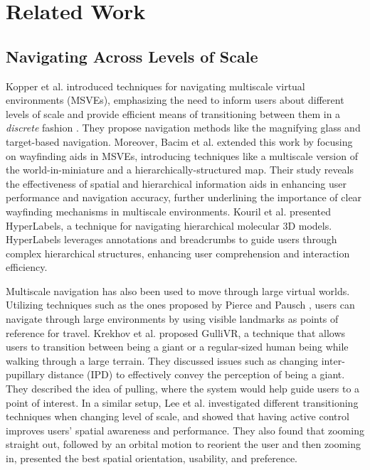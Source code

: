 \section{Related Work}
\subsection{Navigating Across Levels of Scale}
Kopper et al. \cite{kopper_design_2006} introduced techniques for navigating multiscale virtual environments (MSVEs), emphasizing the need to inform users about different levels of scale and provide efficient means of transitioning between them in a \textit{discrete} fashion \cite{al_zayer_virtual_2020}. They propose navigation methods like the magnifying glass and target-based navigation. Moreover, Bacim et al. \cite{bacim_wayfinding_2009} extended this work by focusing on wayfinding aids in MSVEs, introducing techniques like a multiscale version of the world-in-miniature \cite{stoakley_virtual_1995, laviola_hands-free_2001, wingrave_overcoming_2006} and a hierarchically-structured map. Their study reveals the effectiveness of spatial and hierarchical information aids in enhancing user performance and navigation accuracy, further underlining the importance of clear wayfinding mechanisms in multiscale environments. Kouril et al. \cite{kouril_hyperlabels_2021} presented HyperLabels, a technique for navigating hierarchical molecular 3D models. HyperLabels leverages annotations and breadcrumbs to guide users through complex hierarchical structures, enhancing user comprehension and interaction efficiency.

Multiscale navigation has also been used to move through large virtual worlds. Utilizing techniques such as the ones proposed by Pierce and Pausch \cite{pierce_navigation_2004}, users can navigate through large environments by using visible landmarks as points of reference for travel. Krekhov et al. \cite{krekhov_gullivr_2018} proposed GulliVR, a technique that allows users to transition between being a giant or a regular-sized human being while walking through a large terrain. They discussed issues such as changing inter-pupillary distance (IPD) to effectively convey the perception of being a giant. They described the idea of pulling, where the system would help guide users to a point of interest. In a similar setup, Lee et al. \cite{lee_designing_2023} investigated different transitioning techniques when changing level of scale, and showed that having active control improves users' spatial awareness and performance. They also found that zooming straight out, followed by an orbital motion to reorient the user and then zooming in, presented the best spatial orientation, usability, and preference.

